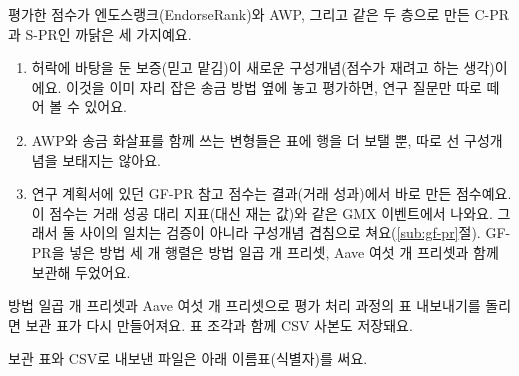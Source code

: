 
평가한 점수가 엔도스랭크(EndorseRank)와 AWP, 그리고 같은 두 층으로 만든 C-PR과 S-PR인 까닭은 세 가지예요.

\begin{enumerate}
\item 허락에 바탕을 둔 보증(믿고 맡김)이 새로운 구성개념(점수가 재려고 하는 생각)이에요. 이것을 이미 자리 잡은 송금 방법 옆에 놓고 평가하면, 연구 질문만 따로 떼어 볼 수 있어요.
\item AWP와 송금 화살표를 함께 쓰는 변형들은 표에 행을 더 보탤 뿐, 따로 선 구성개념을 보태지는 않아요.
\item 연구 계획서에 있던 GF-PR 참고 점수는 결과(거래 성과)에서 바로 만든 점수예요. 이 점수는 거래 성공 대리 지표(대신 재는 값)와 같은 GMX 이벤트에서 나와요. 그래서 둘 사이의 일치는 검증이 아니라 구성개념 겹침으로 쳐요(\ref{sub:gf-pr}절). GF-PR을 넣은 방법 세 개 행렬은 방법 일곱 개 프리셋, Aave 여섯 개 프리셋과 함께 보관해 두었어요.
\end{enumerate}


방법 일곱 개 프리셋과 Aave 여섯 개 프리셋으로 평가 처리 과정의 표 내보내기를 돌리면 보관 표가 다시 만들어져요. 표 조각과 함께 CSV 사본도 저장돼요.


보관 표와 CSV로 내보낸 파일은 아래 이름표(식별자)를 써요.

